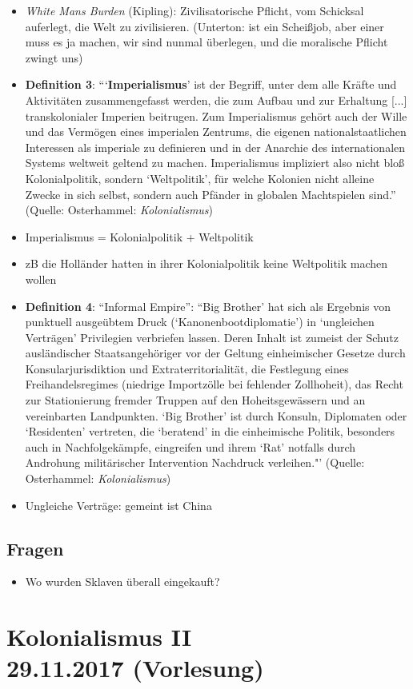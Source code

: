 \documentclass[emulatestandardclasses]{scrartcl}
\begin{document}
\begin{itemize}
  \item \emph{White Mans Burden} (Kipling): Zivilisatorische Pflicht, vom Schicksal auferlegt, die Welt zu zivilisieren. (Unterton: ist ein Scheißjob, aber einer muss es ja machen, wir sind nunmal überlegen, und die moralische Pflicht zwingt uns)
  \item \textbf{Definition 3}: "``\textbf{Imperialismus}' ist der Begriff, unter dem alle Kräfte und Aktivitäten zusammengefasst werden, die zum Aufbau und zur Erhaltung [...] transkolonialer Imperien beitrugen. Zum Imperialismus gehört auch der Wille und das Vermögen eines imperialen Zentrums, die eigenen nationalstaatlichen Interessen als imperiale zu definieren und in der Anarchie des internationalen Systems weltweit geltend zu machen. Imperialismus impliziert also nicht bloß Kolonialpolitik, sondern `Weltpolitik', für welche Kolonien nicht alleine Zwecke in sich selbst, sondern auch Pfänder in globalen Machtspielen sind."' (Quelle: Osterhammel: \emph{Kolonialismus}) 
  \item Imperialismus = Kolonialpolitik + Weltpolitik
  \item zB die Holländer hatten in ihrer Kolonialpolitik keine Weltpolitik machen wollen
  \item \textbf{Definition 4}: "`Informal Empire"': ``Big Brother' hat sich als Ergebnis von punktuell ausgeübtem Druck (`Kanonenbootdiplomatie') in `ungleichen Verträgen' Privilegien verbriefen lassen. Deren Inhalt ist zumeist der Schutz ausländischer Staatsangehöriger vor der Geltung einheimischer Gesetze durch Konsularjurisdiktion und Extraterritorialität, die Festlegung eines Freihandelsregimes (niedrige Importzölle bei fehlender Zollhoheit), das Recht zur Stationierung fremder Truppen auf den Hoheitsgewässern und an vereinbarten Landpunkten. `Big Brother' ist durch Konsuln, Diplomaten oder `Residenten' vertreten, die `beratend' in die einheimische Politik, besonders auch in Nachfolgekämpfe, eingreifen und ihrem `Rat' notfalls durch Androhung militärischer Intervention Nachdruck verleihen."' (Quelle: Osterhammel: \emph{Kolonialismus})
  \item Ungleiche Verträge: gemeint ist China 
\end{itemize}

\subsection{Fragen}

\begin{itemize}
  \item Wo wurden Sklaven überall eingekauft?
\end{itemize}

\section{Kolonialismus II\\29.11.2017 (Vorlesung)}

\newpage
\end{document}
